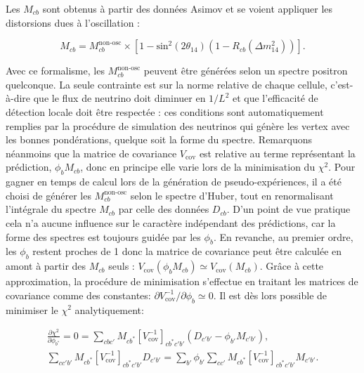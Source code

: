 Les $M_{cb}$ sont obtenus à partir des données Asimov et se voient appliquer les distorsions dues à l'oscillation :

\begin{equation}
    M_{cb} = M_{cb}^\textrm{non-osc} \times \left[1 - \textrm{sin}^2(2\theta_{14})\left(1 - R_{cb}(\Delta m_{14}^2) \right) \right].
\end{equation}

\bigbreak

Avec ce formalisme, les $M_{cb}^\textrm{non-osc}$ peuvent être générées selon un spectre positron quelconque. La seule contrainte est sur la norme relative de chaque cellule, c'est-à-dire que le flux de neutrino doit diminuer en $1/L^2$ et que l'efficacité de détection locale doit être respectée : ces conditions sont automatiquement remplies par la procédure de simulation des neutrinos qui génère les vertex avec les bonnes pondérations, quelque soit la forme du spectre. Remarquons néanmoins que la matrice de covariance $V_\textrm{cov}$ est relative au terme représentant la prédiction, $\phi_bM_{cb}$, donc en principe elle varie lors de la minimisation du $\chi^2$. Pour gagner en temps de calcul lors de la génération de pseudo-expériences, il a été choisi de générer les $M_{cb}^\textrm{non-osc}$ selon le spectre d'Huber, tout en renormalisant l'intégrale du spectre $M_{cb}$ par celle des données $D_{cb}$. D'un point de vue pratique cela n'a aucune influence sur le caractère indépendant des prédictions, car la forme des spectres est toujours guidée par les $\phi_b$. En revanche, au premier ordre, les $\phi_b$ restent proches de 1 donc la matrice de covariance peut être calculée en amont à partir des $M_{cb}$ seuls : $V_\textrm{cov}(\phi_bM_{cb}) \simeq V_\textrm{cov}(M_{cb})$. Grâce à cette approximation, la procédure de minimisation s'effectue en traitant les matrices de covariance comme des constantes: $\partial V^{-1}_\textrm{cov}/\partial \phi_b \simeq 0$. Il est dès lors possible de minimiser le $\chi^2$ analytiquement:

\begin{equation}
    \begin{gathered}
        \frac{\partial \chi^2}{\partial \phi_{b^*}} = 0 = \sum_{cbc'} M_{cb^*} \left[V^{-1}_\textrm{cov} \right]_{cb^*c'b'} \left(D_{c'b'} - \phi_{b'}M_{c'b'} \right),\\
        \sum_{cc'b'} M_{cb^*} \left[V^{-1}_\textrm{cov} \right]_{cb^*c'b'} D_{c'b'} = \sum_{b'} \phi_{b'} \sum_{cc'} M_{cb^*} \left[V^{-1}_\textrm{cov} \right]_{cb^*c'b'} M_{c'b'}.
    \end{gathered}
\end{equation}

